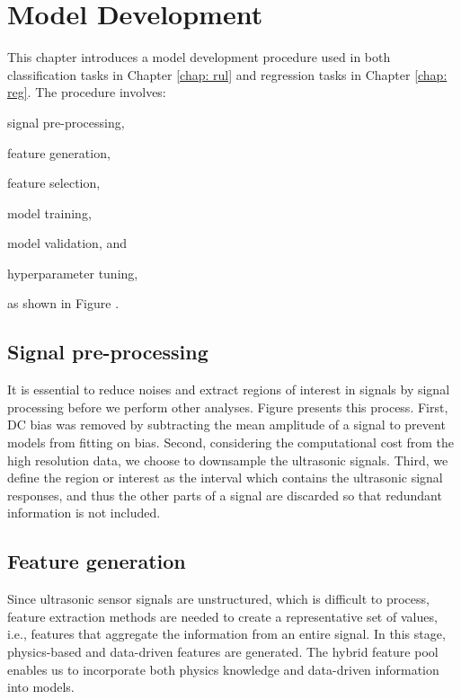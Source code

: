 \chapter{Model Development}
\label{chap: model}

This chapter introduces a model development procedure used in both classification tasks in Chapter \ref{chap: rul} and regression tasks in Chapter \ref{chap: reg}. The procedure involves:
\begin{enumerate*}[label=\itshape\alph*\upshape)]
    \item signal pre-processing,
    \item feature generation,
    \item feature selection,
    \item model training,
    \item model validation, and
    \item hyperparameter tuning,
\end{enumerate*}
as shown in Figure .

\section{Signal pre-processing}
It is essential to reduce noises and extract regions of interest in signals by signal processing before we perform other analyses. Figure presents this process. First, DC bias was removed by subtracting the mean amplitude of a signal to prevent models from fitting on bias. Second, considering the computational cost from the high resolution data, we choose to downsample the ultrasonic signals. Third, we define the region or interest as the interval which contains the ultrasonic signal responses, and thus the other parts of a signal are discarded so that redundant information is not included.

\section{Feature generation}
Since ultrasonic sensor signals are unstructured, which is difficult to process, feature extraction methods are needed to create a representative set of values, i.e., features that aggregate the information from an entire signal. In this stage, physics-based and data-driven features are generated. The hybrid feature pool enables us to incorporate both physics knowledge and data-driven information into models.


